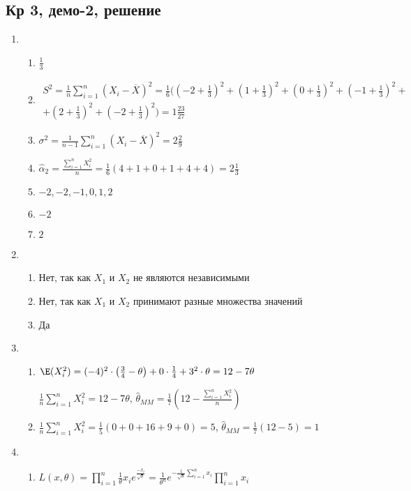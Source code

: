 \subsection{Кр 3, демо-2, решение}



\begin{enumerate}
\item
\begin{enumerate}
\item $\frac{1}{3}$
\item
\begin{multline*}
S^2 = \frac{1}{n} \sum_{i=1}^n (X_i - \overline{X})^2 = \frac{1}{6} ( \left(-2 + \frac{1}{3}\right)^2 + \left(1 + \frac{1}{3} \right)^2 + \left(0 + \frac{1}{3}\right)^2 + \left(-1 + \frac{1}{3}\right)^2 + \\
+ \left(2+ \frac{1}{3}\right)^2 + \left(-2+ \frac{1}{3}\right)^2 ) = 1\frac{23}{27}
\end{multline*}
\item $\sigma^2 = \frac{1}{n-1} \sum_{i=1}^n (X_i - \overline{X})^2 =2 \frac{2}{9}$
\item $\hat{\alpha}_2 = \frac{\sum_{i=1}^n X_i^2}{n} = \frac{1}{6} (4 + 1 + 0 + 1 + 4 + 4) = 2\frac{1}{3}$
\item $-2, -2, -1, 0, 1, 2$
\item $-2$
\item $2$
\end{enumerate}

\item
\begin{enumerate}
\item Нет, так как $X_1$ и $X_2$ не являются независимыми
\item Нет, так как $X_1$ и $X_2$ принимают разные множества значений
\item Да
\end{enumerate}

\item
\begin{enumerate}
\item $\E(X_i^2) = (-4)^2 \cdot \left(\frac{3}{4} - \theta\right) + 0\cdot \frac{1}{4}+ 3^2 \cdot \theta = 12 - 7\theta$

$\frac{1}{n} \sum_{i=1}^n X_i^2 = 12 - 7\theta$, $\hat{\theta}_{MM} = \frac{1}{7} \left(12-\frac{\sum_{i=1}^n X_i^2}{n} \right)$
\item $\frac{1}{n}\sum_{i=1}^n X_i^2 = \frac{1}{5}(0 + 0 + 16  + 9+ 0) = 5$, $\hat{\theta}_{MM} =\frac{1}{7} (12-5)= 1$
\end{enumerate}
\item
\begin{enumerate}
\item $L(x, \theta) = \prod_{i=1}^{n} \frac{1}{\theta} x_i e^{\frac{-x_i}{\sqrt{\theta}}} = \frac{1}{\theta^n} e^{-\frac{1}{\sqrt{\theta}} \sum_{i=1}^n x_i} \prod_{i=1}^{n}x_i$


\end{enumerate}
\end{enumerate}
